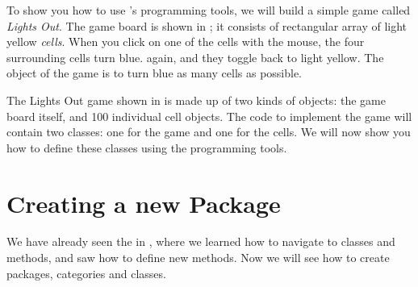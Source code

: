 \documentclass[a4paper,10pt,twoside]{book}
\begin{document}
To show you how to use \pharo's programming tools, we will build a simple game called \emph{Lights Out}.  The game board is shown in ; it consists of rectangular array of light yellow \emph{cells}.  When you click on one of the cells with the mouse, the four surrounding cells turn blue.  \Click again, and they toggle back to light yellow.  The object of the game is to turn blue as many cells as possible.

The Lights Out game shown in  is made up of two kinds of objects: the game board itself, and 100 individual cell objects.  The \pharo code to implement the game will contain two classes: one for the game and one for the cells.
We will now show you how to define these classes using the \pharo programming tools.

\section{Creating a new Package}

We have already seen the  in , where we learned how to navigate to classes and methods, and saw how to define new methods.
Now we will see how to create packages, categories and classes.

\end{document}
